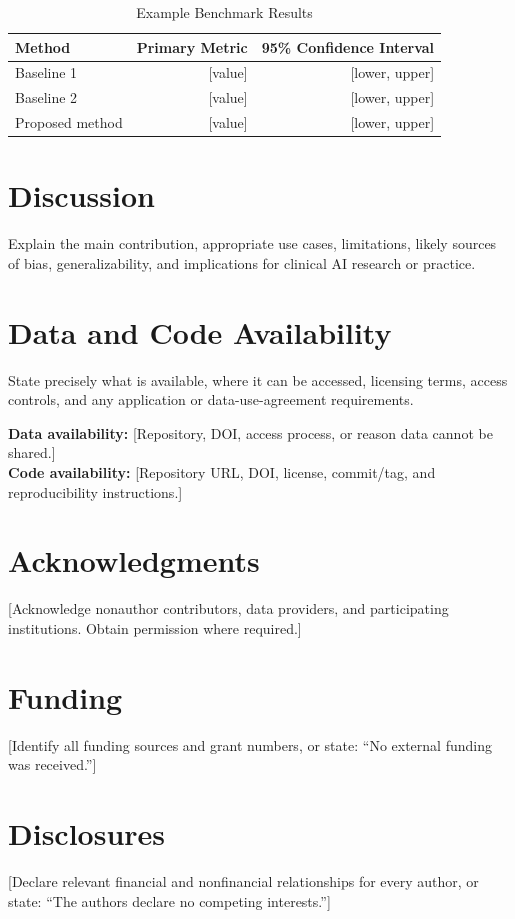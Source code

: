\documentclass[11pt]{article}
\begin{document}
\begin{table}[htbp]
	\centering
	\caption{Example Benchmark Results}
	\begin{tabular}{@{}lrr@{}}
		\toprule
		Method          & Primary Metric & 95\% Confidence Interval \\
		\midrule
		Baseline 1      & [value]        & [lower, upper]           \\
		Baseline 2      & [value]        & [lower, upper]           \\
		Proposed method & [value]        & [lower, upper]           \\
		\bottomrule
	\end{tabular}
	\label{tab:benchmark-results}
\end{table}

\section{Discussion}
Explain the main contribution, appropriate use cases, limitations, likely sources of bias, generalizability, and implications for clinical AI research or practice.

\section{Data and Code Availability}
State precisely what is available, where it can be accessed, licensing terms, access controls, and any application or data-use-agreement requirements.

\noindent\textbf{Data availability:} [Repository, DOI, access process, or reason data cannot be shared.]\\
\textbf{Code availability:} [Repository URL, DOI, license, commit/tag, and reproducibility instructions.]

\section{Acknowledgments}
 [Acknowledge nonauthor contributors, data providers, and participating institutions. Obtain permission where required.]

\section{Funding}
 [Identify all funding sources and grant numbers, or state: ``No external funding was received.'']

\section{Disclosures}
 [Declare relevant financial and nonfinancial relationships for every author, or state: ``The authors declare no competing interests.'']
\end{document}
